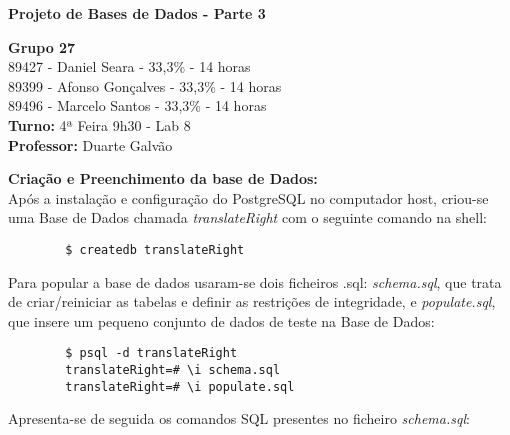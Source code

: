\documentclass[12pt]{report}
\begin{document}
    \begin{titlepage}
        \begin{center}

            \vspace*{\fill}
            \Huge
            \textbf{Projeto de Bases de Dados - Parte 3}

            \vspace*{\fill}

            \Large
            \textbf{Grupo 27} \\
            89427 - Daniel Seara - 33,3\% - 14 horas \\
            89399 - Afonso Gonçalves - 33,3\% - 14 horas \\
            89496 - Marcelo Santos - 33,3\% - 14 horas \\

            \bigskip
            \textbf{Turno:} 4ª Feira 9h30 - Lab 8\\ \textbf{Professor:} Duarte Galvão

        \end{center}
    \end{titlepage}

    \Large
    \textbf{Criação e Preenchimento da base de Dados:}\\

    \normalsize
    \vspace{2mm}
    Após a instalação e configuração do PostgreSQL no computador host, criou-se uma Base de Dados chamada \textit{translateRight} com o seguinte comando na shell:
    \begin{verbatim}
        $ createdb translateRight
    \end{verbatim}

    Para popular a base de dados usaram-se dois ficheiros .sql: \textit{schema.sql}, que trata de criar/reiniciar as tabelas e definir as restrições de integridade, e \textit{populate.sql}, que insere um pequeno conjunto de dados de teste na Base de Dados:
    \begin{verbatim}
        $ psql -d translateRight
        translateRight=# \i schema.sql
        translateRight=# \i populate.sql
    \end{verbatim}


    \vspace{2mm}
    Apresenta-se de seguida os comandos SQL presentes no ficheiro \textit{schema.sql}:
\end{document}
